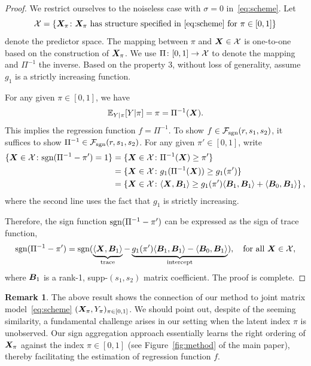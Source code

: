 \documentclass[11pt]{article}
\newcommand*{\KeepStyleUnderBrace}[1]{%
\mathop{%
\mathchoice
{\underbrace{\displaystyle#1}}%
{\underbrace{\textstyle#1}}%
{\underbrace{\scriptstyle#1}}%
{\underbrace{\scriptscriptstyle#1}}%
}\limits
}
\theoremstyle{plain}
\theoremstyle{definition}
\newtheorem{rmk}{Remark}
\def\caliF{\tF_{\textup{sgn}}}
\def\sign{\textup{sgn}}
\def\caliF{\tF_{\textup{sgn}}}
\begin{document}
\begin{proof}
We restrict ourselves to the noiseless case with $\sigma=0$ in~\eqref{eq:scheme}. 
Let 
\[
\mathcal{X}=\{\bm X_\pi\colon \bm X_\pi \text{ has structure specified in~\eqref{eq:scheme} for $\pi\in[0,1]$}\}
\]
denote the predictor space. The mapping between $\pi$ and $\bm X\in \mathcal{X}$ is one-to-one based on the construction of $\bm X_\pi$. We use $\Pi\colon [0,1]\to \mathcal{X}$ to denote the mapping and $\Pi^{-1}$ the inverse. Based on the property 3, without loss of generality, assume $g_1$ is a strictly increasing function. 


For any given $\pi\in[0,1]$, we have
\[
\mathbb{E}_{Y|\pi}[Y|\pi]=\pi=\Pi^{-1}(\bm X).
\]
This implies the regression function $f=\Pi^{-1}$. To show $f\in \caliF(r,s_1,s_2)$, it suffices to show $\Pi^{-1}\in\caliF(r,s_1,s_2)$. For any given $\pi'\in[0,1]$, write 
\begin{align}
\{\mX\in \tX \colon \sign(\Pi^{-1}-\pi')=1\}&=\{\mX\in \tX \colon \Pi^{-1}(\mX)\geq \pi'\}\\
&=\{\mX\in \tX \colon g_1(\Pi^{-1}(\mX))\geq g_1(\pi')\}\\
&=\left\{\mX\in \tX \colon \langle \mX, \mB_1\rangle \geq g_1(\pi')\langle \mB_1,\mB_1\rangle + \langle \mB_0, \mB_1 \rangle \right\},
\end{align}
where the second line uses the fact that $g_1$ is strictly increasing. 

Therefore, the sign function $\sign(\Pi^{-1}-\pi')$ can be expressed as the sign of trace function,
\[
\sign(\Pi^{-1}-\pi')=\sign(\KeepStyleUnderBrace{\langle \mX,\mB_1 \rangle}_{\text{trace}} - \KeepStyleUnderBrace{g_1(\pi')\langle \mB_1,\mB_1\rangle-\langle \mB_0,\mB_1\rangle}_{\text{intercept}}),\quad \text{for all }\mX\in\tX,
\]
where $\bm B_1$ is a rank-1, supp-$(s_1,s_2)$ matrix coefficient. The proof is complete. 
\end{proof}

\begin{rmk}
The above result shows the connection of our method to joint matrix model~\eqref{eq:scheme} $(\bm X_\pi, Y_\pi)_{\pi\in[0,1]}$. We should point out, despite of the seeming similarity, a fundamental challenge arises in our setting when the latent index $\pi$ is unobserved. Our sign aggregation approach essentially learns the right ordering of $\bm X_\pi$ against the index $\pi\in[0,1]$ (see Figure~\ref{fig:method} of the main paper), thereby facilitating the estimation of regression function $f$. 
\end{rmk}
\end{document}
